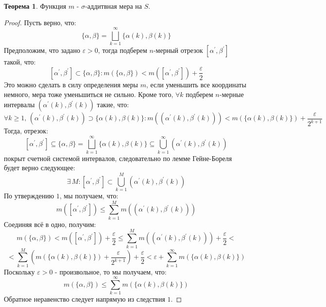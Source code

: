\documentclass[12pt]{article}
\newcommand{\VE}{\varepsilon}
\theoremstyle{definition}
\newtheorem{theorem}{Теорема}
\begin{document}
\begin{theorem}
	Функция $m$ - $\sigma$-аддитвная мера на $S$.
\end{theorem}
\begin{proof}
	Пусть верно, что: 
	$$
		\{\alpha, \beta\} = \displaystyle \bigsqcup\limits_{k = 1}^{\infty} \{\alpha(k), \beta(k)\}
	$$ 
	Предположим, что задано $\VE > 0$, тогда подберем $n$-мерный отрезок $[\alpha^\prime, \beta^\prime]$ такой, что: 
	$$
		[\alpha^\prime, \beta^\prime] \subset \{\alpha, \beta\} \colon m\left(\{\alpha,\beta\}\right) < m([\alpha^\prime, \beta^\prime]) + \dfrac{\VE}{2}
	$$
	Это можно сделать в силу определения меры $m$, если уменьшить все координаты немного, мера тоже уменьшиться не сильно. Кроме того, $\forall k$ подберем $n$-мерные интервалы $(\alpha^\prime(k), \beta^\prime(k))$ такие, что:
	$$
		\forall k \geq 1, \, (\alpha^\prime(k), \beta^\prime(k)) \supset \{\alpha(k), \beta(k)\} \colon m\left(\left(\alpha^\prime(k), \beta^\prime(k)\right)\right) < m\left(\{\alpha(k),\beta(k)\}\right) + \dfrac{\VE}{2^{k+1}}
	$$
	Тогда, отрезок: 
	$$
		[\alpha^\prime, \beta^\prime]\subseteq \{\alpha, \beta\} = \bigsqcup\limits_{k = 1}^{\infty}\{\alpha(k),\beta(k)\} \subseteq \bigcup\limits_{k = 1}^{\infty}\left(\alpha^\prime(k),\beta^\prime(k)\right)
	$$ 
	покрыт счетной системой интервалов, следовательно по лемме Гейне-Бореля будет верно следующее:
	$$
		\exists \, M \colon [\alpha^\prime, \beta^\prime] \subset \bigcup\limits_{k = 1}^{M}\left(\alpha^\prime(k),\beta^\prime(k)\right)
	$$
	По утверждению $1$, мы получаем, что:
	$$
		m\left([\alpha^\prime,\beta^\prime]\right) \leq \sum\limits_{k = 1}^{M}m\left(\left(\alpha^\prime(k),\beta^\prime(k)\right)\right) 
	$$
	Соединяя всё в одно, получим:
	$$
		m\left(\{\alpha,\beta\}\right) < m([\alpha^\prime, \beta^\prime]) + \dfrac{\VE}{2} \leq \sum\limits_{k = 1}^{M}m\left(\left(\alpha^\prime(k),\beta^\prime(k)\right)\right) + \dfrac{\VE}{2} < 
	$$
	$$
		< \sum\limits_{k = 1}^{M}\left(m\left(\{\alpha(k),\beta(k)\}\right) + \dfrac{\VE}{2^{k+1}}\right) + \dfrac{\VE}{2} < \VE + \sum\limits_{k = 1}^{\infty}m\left(\{\alpha(k),\beta(k)\}\right) 
	$$
	Поскольку $\VE > 0$ - произвольное, то мы получаем, что:
	$$
		m\left(\{\alpha,\beta\}\right) \leq \sum\limits_{k = 1}^{\infty}m\left(\{\alpha(k),\beta(k)\}\right) 
	$$
	Обратное неравенство следует напрямую из следствия $1$.
\end{proof}

\newpage
\end{document}

